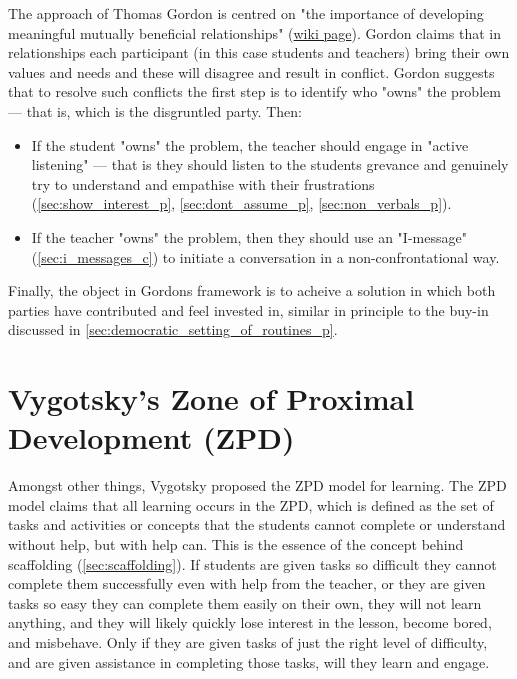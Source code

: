 \documentclass[12pt]{report}
\begin{document}
The approach of Thomas Gordon is centred on "the importance of developing meaningful mutually beneficial relationships" (\href{https://en.wikibooks.org/wiki/Classroom_Management_Theorists_and_Theories/Thomas_Gordon}{wiki page}). Gordon claims that in relationships each participant (in this case students and teachers) bring their own values and needs and these will disagree and result in conflict. Gordon suggests that to resolve such conflicts the first step is to identify who "owns" the problem --- that is, which is the disgruntled party. Then:
\begin{itemize}
  \item If the student "owns" the problem, the teacher should engage in "active listening" --- that is they should listen to the students grevance and genuinely try to understand and empathise with their frustrations (\ref{sec:show_interest_p}, \ref{sec:dont_assume_p}, \ref{sec:non_verbals_p}).
  \item If the teacher "owns" the problem, then they should use an "I-message" (\ref{sec:i_messages_c}) to initiate a conversation in a non-confrontational way.
\end{itemize}
Finally, the object in Gordons framework is to acheive a solution in which both parties have contributed and feel invested in, similar in principle to the buy-in discussed in \ref{sec:democratic_setting_of_routines_p}.


\section{Vygotsky's Zone of Proximal Development (ZPD)}
\label{sec:zpd_theory}


Amongst other things, Vygotsky proposed the ZPD model for learning. The ZPD model claims that all learning occurs in the ZPD, which is defined as the set of tasks and activities or concepts that the students cannot complete or understand without help, but with help can. This is the essence of the concept behind scaffolding (\ref{sec:scaffolding}). If students are given tasks so difficult they cannot complete them successfully even with help from the teacher, or they are given tasks so easy they can complete them easily on their own, they will not learn anything, and they will likely quickly lose interest in the lesson, become bored, and misbehave. Only if they are given tasks of just the right level of difficulty, and are given assistance in completing those tasks, will they learn and engage.
\end{document}
